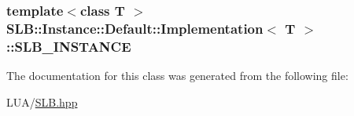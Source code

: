 \subsubsection[{\texorpdfstring{S\+L\+B\+\_\+\+I\+N\+S\+T\+A\+N\+CE}{SLB_INSTANCE}}]{\setlength{\rightskip}{0pt plus 5cm}template$<$class T $>$ {\bf S\+L\+B\+::\+Instance\+::\+Default\+::\+Implementation}$<$ T $>$\+::S\+L\+B\+\_\+\+I\+N\+S\+T\+A\+N\+CE\hspace{0.3cm}{\ttfamily [protected]}}\hypertarget{classSLB_1_1Instance_1_1Default_1_1Implementation_add0213292b39cdf6a70b58c65a623e8a}{}\label{classSLB_1_1Instance_1_1Default_1_1Implementation_add0213292b39cdf6a70b58c65a623e8a}


The documentation for this class was generated from the following file\+:\begin{DoxyCompactItemize}
\item 
L\+U\+A/\hyperlink{SLB_8hpp}{S\+L\+B.\+hpp}\end{DoxyCompactItemize}
